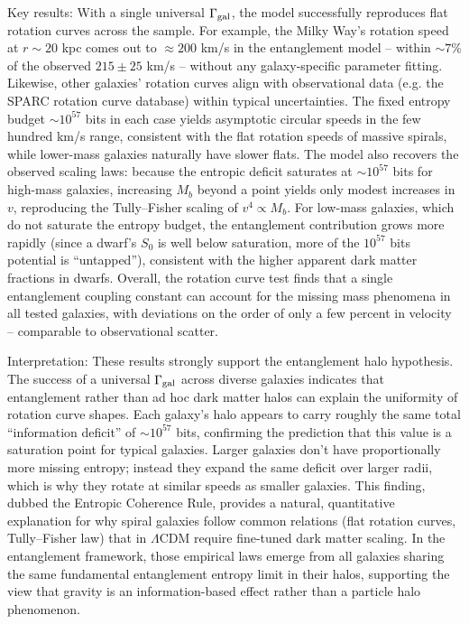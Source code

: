 \documentclass[11pt]{article}
\begin{document}
Key results: With a single universal $\Gamma_{\rm gal}$, the model successfully reproduces flat rotation curves across the sample. For example, the Milky Way’s rotation speed at $r\sim20$ kpc comes out to $\approx 200$ km/s in the entanglement model – within $\sim 7\%$ of the observed $215\pm25$ km/s – without any galaxy-specific parameter fitting. Likewise, other galaxies’ rotation curves align with observational data (e.g. the SPARC rotation curve database) within typical uncertainties. The fixed entropy budget $\sim 10^{57}$ bits in each case yields asymptotic circular speeds in the few hundred km/s range, consistent with the flat rotation speeds of massive spirals, while lower-mass galaxies naturally have slower flats. The model also recovers the observed scaling laws: because the entropic deficit saturates at $\sim 10^{57}$ bits for high-mass galaxies, increasing $M_b$ beyond a point yields only modest increases in $v$, reproducing the Tully–Fisher scaling of $v^4 \propto M_b$. For low-mass galaxies, which do not saturate the entropy budget, the entanglement contribution grows more rapidly (since a dwarf’s $S_0$ is well below saturation, more of the $10^{57}$ bits potential is “untapped”), consistent with the higher apparent dark matter fractions in dwarfs. Overall, the rotation curve test finds that a single entanglement coupling constant can account for the missing mass phenomena in all tested galaxies, with deviations on the order of only a few percent in velocity – comparable to observational scatter.

Interpretation: These results strongly support the entanglement halo hypothesis. The success of a universal $\Gamma_{\rm gal}$ across diverse galaxies indicates that entanglement rather than ad hoc dark matter halos can explain the uniformity of rotation curve shapes. Each galaxy’s halo appears to carry roughly the same total “information deficit” of $\sim 10^{57}$ bits, confirming the prediction that this value is a saturation point for typical galaxies. Larger galaxies don’t have proportionally more missing entropy; instead they expand the same deficit over larger radii, which is why they rotate at similar speeds as smaller galaxies. This finding, dubbed the Entropic Coherence Rule, provides a natural, quantitative explanation for why spiral galaxies follow common relations (flat rotation curves, Tully–Fisher law) that in $\Lambda$CDM require fine-tuned dark matter scaling. In the entanglement framework, those empirical laws emerge from all galaxies sharing the same fundamental entanglement entropy limit in their halos, supporting the view that gravity is an information-based effect rather than a particle halo phenomenon.
\end{document}
